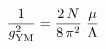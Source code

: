 \begin{equation}
\frac{1}{g_{\rm YM}^2} = \frac{2 \, N}{8 \, \pi^2}\;
\frac{\mu}{\Lambda}
\end{equation}

